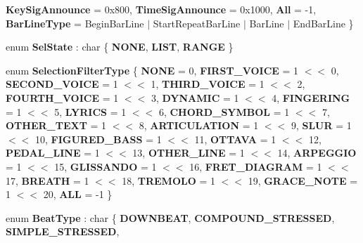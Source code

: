 \begin{DoxyCompactItemize}
{\bfseries Key\+Sig\+Announce} = 0x800, 
{\bfseries Time\+Sig\+Announce} = 0x1000, 
{\bfseries All} = -\/1, 
{\bfseries Bar\+Line\+Type} = Begin\+Bar\+Line $\vert$ Start\+Repeat\+Bar\+Line $\vert$ Bar\+Line $\vert$ End\+Bar\+Line
 \}
\item 
\mbox{\label{namespace_ms_a8ba055802fd4a7411880d6902e984be1}} 
enum {\bfseries Sel\+State} \+: char \{ {\bfseries N\+O\+NE}, 
{\bfseries L\+I\+ST}, 
{\bfseries R\+A\+N\+GE}
 \}
\item 
\mbox{\label{namespace_ms_a175bedec052e1c2fd09257ffde43d847}} 
enum {\bfseries Selection\+Filter\+Type} \{ \newline
{\bfseries N\+O\+NE} = 0, 
{\bfseries F\+I\+R\+S\+T\+\_\+\+V\+O\+I\+CE} = 1 $<$$<$ 0, 
{\bfseries S\+E\+C\+O\+N\+D\+\_\+\+V\+O\+I\+CE} = 1 $<$$<$ 1, 
{\bfseries T\+H\+I\+R\+D\+\_\+\+V\+O\+I\+CE} = 1 $<$$<$ 2, 
\newline
{\bfseries F\+O\+U\+R\+T\+H\+\_\+\+V\+O\+I\+CE} = 1 $<$$<$ 3, 
{\bfseries D\+Y\+N\+A\+M\+IC} = 1 $<$$<$ 4, 
{\bfseries F\+I\+N\+G\+E\+R\+I\+NG} = 1 $<$$<$ 5, 
{\bfseries L\+Y\+R\+I\+CS} = 1 $<$$<$ 6, 
\newline
{\bfseries C\+H\+O\+R\+D\+\_\+\+S\+Y\+M\+B\+OL} = 1 $<$$<$ 7, 
{\bfseries O\+T\+H\+E\+R\+\_\+\+T\+E\+XT} = 1 $<$$<$ 8, 
{\bfseries A\+R\+T\+I\+C\+U\+L\+A\+T\+I\+ON} = 1 $<$$<$ 9, 
{\bfseries S\+L\+UR} = 1 $<$$<$ 10, 
\newline
{\bfseries F\+I\+G\+U\+R\+E\+D\+\_\+\+B\+A\+SS} = 1 $<$$<$ 11, 
{\bfseries O\+T\+T\+A\+VA} = 1 $<$$<$ 12, 
{\bfseries P\+E\+D\+A\+L\+\_\+\+L\+I\+NE} = 1 $<$$<$ 13, 
{\bfseries O\+T\+H\+E\+R\+\_\+\+L\+I\+NE} = 1 $<$$<$ 14, 
\newline
{\bfseries A\+R\+P\+E\+G\+G\+IO} = 1 $<$$<$ 15, 
{\bfseries G\+L\+I\+S\+S\+A\+N\+DO} = 1 $<$$<$ 16, 
{\bfseries F\+R\+E\+T\+\_\+\+D\+I\+A\+G\+R\+AM} = 1 $<$$<$ 17, 
{\bfseries B\+R\+E\+A\+TH} = 1 $<$$<$ 18, 
\newline
{\bfseries T\+R\+E\+M\+O\+LO} = 1 $<$$<$ 19, 
{\bfseries G\+R\+A\+C\+E\+\_\+\+N\+O\+TE} = 1 $<$$<$ 20, 
{\bfseries A\+LL} = -\/1
 \}
\item 
\mbox{\label{namespace_ms_aa31a684c01523954d7fffb5c51539f2c}} 
enum {\bfseries Beat\+Type} \+: char \{ \newline
{\bfseries D\+O\+W\+N\+B\+E\+AT}, 
{\bfseries C\+O\+M\+P\+O\+U\+N\+D\+\_\+\+S\+T\+R\+E\+S\+S\+ED}, 
{\bfseries S\+I\+M\+P\+L\+E\+\_\+\+S\+T\+R\+E\+S\+S\+ED}, 
$$
\end{DoxyCompactItemize}
